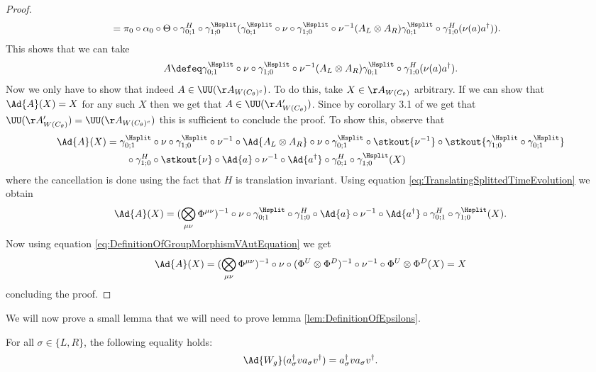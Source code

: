 \begin{proof}
\begin{align}
		\nonumber
		&=\pi_0\circ\alpha_0\circ\Theta\circ\gamma^H_{0;1}\circ\gamma^{\Hsplit}_{1;0}(\gamma^{\Hsplit}_{0;1}\circ\nu\circ\gamma^{\Hsplit}_{1;0}\circ\nu^{-1}(A_L\otimes A_R)\gamma^{\Hsplit}_{0;1}\circ\gamma^H_{1;0}(\nu(a)a^\dagger)).
	\end{align}
	This shows that we can take
	\begin{equation}
		A\defeq \gamma^{\Hsplit}_{0;1}\circ\nu\circ\gamma^{\Hsplit}_{1;0}\circ\nu^{-1}(A_L\otimes A_R)\gamma^{\Hsplit}_{0;1}\circ\gamma^H_{1;0}(\nu(a)a^\dagger).
	\end{equation}
	Now we only have to show that indeed $A\in\UU(\AA_{W(C_\theta)^c})$. To do this, take $X\in\AA_{W(C_\theta)}$ arbitrary. If we can show that $\Ad{A}(X)=X$ for any such $X$ then we get that $A\in\UU(\AA_{W(C_\theta)}')$. Since by corollary 3.1 of \cite{NaScWe_2013} we get that $\UU(\AA_{W(C_\theta)}')=\UU(\AA_{W(C_\theta)^c})$ this is sufficient to conclude the proof. To show this, observe that
	\begin{align}
		\Ad{A}(X)&=\gamma^{\Hsplit}_{0;1}\circ\nu\circ\gamma^{\Hsplit}_{1;0}\circ\nu^{-1}\circ\Ad{A_L\otimes A_R}\circ\nu\circ\gamma^{\Hsplit}_{0;1}\circ\stkout{\nu^{-1}}\circ\stkout{\gamma^{\Hsplit}_{1;0}\circ\gamma^{\Hsplit}_{0;1}}\\
		&\nonumber
		\qquad\circ\gamma^H_{1;0}\circ\stkout{\nu}\circ\Ad{a}\circ\nu^{-1}\circ\Ad{a^\dagger}\circ\gamma^H_{0;1}\circ\gamma^{\Hsplit}_{1;0}(X)
	\end{align}
	where the cancellation is done using the fact that $H$ is translation invariant. Using equation \eqref{eq:TranslatingSplittedTimeEvolution} we obtain
	\begin{equation}
		\Ad{A}(X)=(\bigotimes_{\mu\nu}\Phi^{\mu\nu})^{-1}\circ\nu\circ\gamma^{\Hsplit}_{0;1}\circ\gamma^H_{1;0}\circ\Ad{a}\circ\nu^{-1}\circ\Ad{a^\dagger}\circ\gamma^H_{0;1}\circ\gamma^{\Hsplit}_{1;0}(X).
	\end{equation}
	Now using equation \eqref{eq:DefinitionOfGroupMorphismVAutEquation} we get
	\begin{equation}
		\Ad{A}(X)=(\bigotimes_{\mu\nu}\Phi^{\mu\nu})^{-1}\circ\nu\circ(\Phi^U\otimes\Phi^D)^{-1}\circ\nu^{-1}\circ\Phi^U\otimes\Phi^D(X)=X
	\end{equation}
	concluding the proof.
\end{proof}
We will now prove a small lemma that we will need to prove lemma \ref{lem:DefinitionOfEpsilons}.
\begin{lemma}\label{lem:EqualityTwoTranslationsUsingConnectedPath}
	For all $\sigma\in\{L,R\}$, the following equality holds:
	\begin{equation}
		\Ad{W_g}(a_\sigma^\dagger v a_\sigma v^\dagger)=a_\sigma^\dagger v a_\sigma v^\dagger.
	\end{equation}
\end{lemma}
